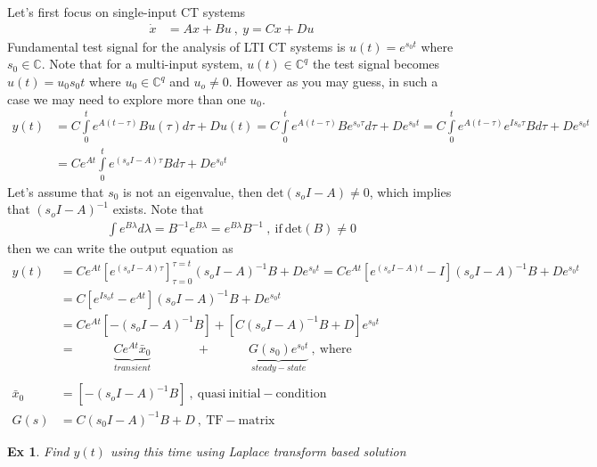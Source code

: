 \documentclass[twoside]{article}
\newtheorem{exmp}[theorem]{Ex}
\begin{document}
Let's first focus on single-input CT systems 
%
\begin{align*}
       \dot{x} &= A x + B u \ , \ y = C x + D u
\end{align*}
%
Fundamental test signal for the analysis of LTI CT systems is $u(t) = e^{s_0 t}$ where $s_0 \in \mathbb{C}$. Note that for a multi-input system, $u(t) \in \mathbb{C}^q$ the test signal becomes $u(t) = u_0 s_0 t$ where $u_0 \in \mathbb{C}^q$ and $u_o \neq 0$. However as you may guess, in such a case we may need to explore more than one $u_0$.
%
\begin{align*}
  y(t) &= C \int\limits_{0}^{t} e^{A ( t - \tau ) } B u(\tau) d \tau + D u(t) = C \int\limits_{0}^{t} e^{A ( t - \tau ) } B e^{s_o \tau} d \tau + D e^{s_0 t} = 
  C \int\limits_{0}^{t} e^{A ( t - \tau ) } e^{I   s_o \tau} B d \tau + D e^{s_0 t}
  \\
  &=   C e^{A t} \int\limits_{0}^{t} e^{(s_o I - A)  \tau} B d \tau + D e^{s_0 t}
\end{align*}
%
Let's assume that $s_0$ is not an eigenvalue, then $\mathrm{det}(s_o I - A) \neq 0$, which implies that $(s_o I - A)^{-1}$ exists. Note that
%
\begin{align*}
\int e^{B \lambda} d \lambda = B^{-1} e^{B \lambda} = e^{B \lambda} B^{-1} \ , \ \mathrm{if} \ \mathrm{det}(B) \neq 0
\end{align*}
%
then we can write the output equation as
\begin{align*}
  y(t) &= C e^{A t} \left[ e^{(s_o I - A)  \tau} \right]_{\tau = 0}^{\tau = t} (s_o I - A)^{-1} B + D e^{s_0 t}
  = C e^{A t} \left[ e^{(s_o I - A)  t} - I \right] (s_o I - A)^{-1} B + D e^{s_0 t}
  \\
  &= C \left[ e^{I s_o t} - e^{A t} \right] (s_o I - A)^{-1} B + D e^{s_0 t} 
  \\
  &=  C e^{A t} \left[ - (s_o I - A)^{-1} B \right] +
  \left[ C (s_o I - A)^{-1} B + D \right] e^{s_0 t}
  \\
  &= \quad \quad  \quad  \underbrace{C e^{A t} \bar{x}_0}_{transient}  \quad \quad \quad \ \ \, +
   \quad \quad \quad \underbrace{G(s_0) e^{s_0 t}}_{steady-state} \ , \ \mathrm{where}
   \\
   \\
   \bar{x}_0 &=  \left[ - (s_o I - A)^{-1} B \right] \ , \ \mathrm{quasi} \ \mathrm{initial-condition}
   \\
   G(s) &= C (s_0 I - A)^{-1} B + D \ , \ \mathrm{TF-matrix} 
\end{align*}

\begin{exmp}
 Find $y(t)$ using this time using Laplace transform based solution 
\end{exmp}
\end{document}
